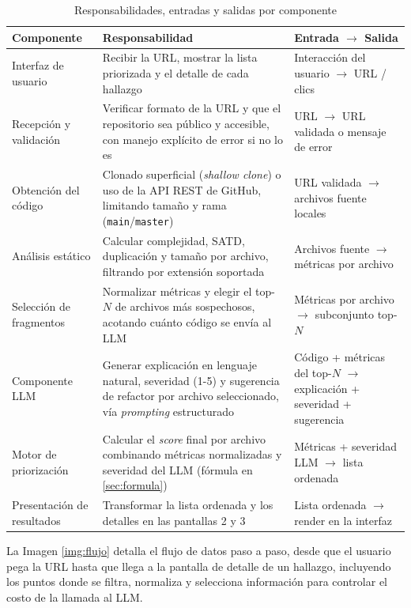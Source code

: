 \begin{table}[H]
\centering
\caption{Responsabilidades, entradas y salidas por componente}
\label{tab:componentes}
\begin{tabular}{p{} p{} p{}}
\toprule
\textbf{Componente} & \textbf{Responsabilidad} & \textbf{Entrada $\to$ Salida} \\
\midrule
Interfaz de usuario & Recibir la URL, mostrar la lista priorizada y el detalle de cada hallazgo & Interacción del usuario $\to$ URL / clics \\[3pt]
Recepción y validación & Verificar formato de la URL y que el repositorio sea público y accesible, con manejo explícito de error si no lo es & URL $\to$ URL validada o mensaje de error \\[3pt]
Obtención del código & Clonado superficial (\textit{shallow clone}) o uso de la API REST de GitHub, limitando tamaño y rama (\texttt{main}/\texttt{master}) & URL validada $\to$ archivos fuente locales \\[3pt]
Análisis estático & Calcular complejidad, SATD, duplicación y tamaño por archivo, filtrando por extensión soportada & Archivos fuente $\to$ métricas por archivo \\[3pt]
Selección de fragmentos & Normalizar métricas y elegir el top-$N$ de archivos más sospechosos, acotando cuánto código se envía al LLM & Métricas por archivo $\to$ subconjunto top-$N$ \\[3pt]
Componente LLM & Generar explicación en lenguaje natural, severidad (1-5) y sugerencia de refactor por archivo seleccionado, vía \textit{prompting} estructurado & Código + métricas del top-$N$ $\to$ explicación + severidad + sugerencia \\[3pt]
Motor de priorización & Calcular el \textit{score} final por archivo combinando métricas normalizadas y severidad del LLM (fórmula en \ref{sec:formula}) & Métricas + severidad LLM $\to$ lista ordenada \\[3pt]
Presentación de resultados & Transformar la lista ordenada y los detalles en las pantallas 2 y 3 & Lista ordenada $\to$ render en la interfaz \\
\bottomrule
\end{tabular}
\end{table}

La Imagen \ref{img:flujo} detalla el flujo de datos paso a paso, desde que el usuario pega la URL hasta que llega a la pantalla de detalle de un hallazgo, incluyendo los puntos donde se filtra, normaliza y selecciona información para controlar el costo de la llamada al LLM.


